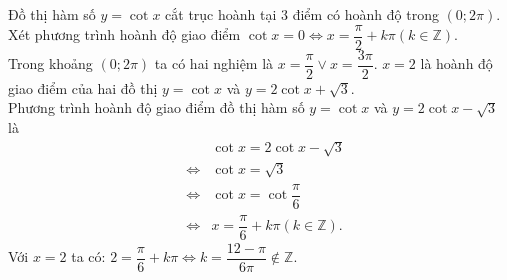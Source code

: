 \begin{ex}
{\begin{itemchoice}
\begin{center}
   \end{center}
   \itemch Đồ thị hàm số $y=\cot x$ cắt  trục hoành tại 3 điểm có hoành độ trong $\left(0;2\pi \right)$.\\
   Xét phương trình hoành độ giao điểm $\cot x=0\Leftrightarrow x=\dfrac{\pi}{2}+k\pi \left(k\in \mathbb{Z}\right)$.\\ 
   Trong khoảng $\left(0;2\pi \right)$ ta có hai nghiệm là  $x=\dfrac{\pi}{2}\vee x=\dfrac{3\pi}{2}$.
   \itemch $x=2$ là hoành độ giao điểm của hai đồ  thị $y=\cot x$ và $y=2\cot x+\sqrt{3}$.\\
   Phương trình hoành độ giao điểm đồ thị hàm số $y=\cot x$ và $y=2\cot x-\sqrt{3}$ là 
   \allowdisplaybreaks 
   \begin{eqnarray*}
    &&\cot x=2\cot  x-\sqrt{3} \\
    &\Leftrightarrow& \cot  x=\sqrt{3} \\
    &\Leftrightarrow&  \cot x=\cot \dfrac{\pi}{6} \\
    &\Leftrightarrow& x=\dfrac{\pi}{6}+k\pi \left(k\in \mathbb{Z}\right). 
   \end{eqnarray*}
   Với $x=2$ ta có: $2=\dfrac{\pi}{6}+k\pi  \Leftrightarrow k=\dfrac{12-\pi}{6\pi} \notin \mathbb{Z}$.
  \end{itemchoice}
 } 
\end{ex}

